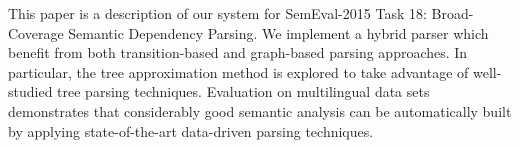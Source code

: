 This paper is a description of our system for SemEval-2015 Task 18: Broad-Coverage Semantic Dependency Parsing. We implement a hybrid parser which benefit from both transition-based and graph-based parsing approaches. In particular, the tree approximation method is explored to take advantage of well-studied tree parsing techniques. Evaluation on multilingual data sets demonstrates that considerably good semantic analysis can be automatically built by applying state-of-the-art data-driven parsing techniques.
